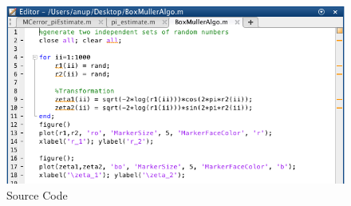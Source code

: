 \documentclass[12pt, oneside]{article}   	%
\begin{document}
	\begin{figure} [!htbp]
	\centering
	 \includegraphics[scale=0.6]{BoxMullerAlgo_code.jpg}
	\caption{Source Code}
	\end{figure}
\end{document}
